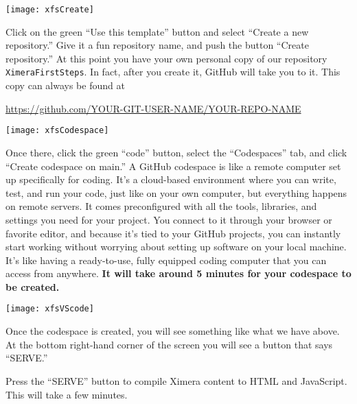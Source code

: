 \documentclass{ximera}
\begin{document}
\begin{image}
    \texttt{[image: xfsCreate]}
\end{image}
Click on the green ``Use this template'' button and select ``Create a
new repository.'' Give it a fun repository name, and push the button
``Create repository.'' 
At this point you have your own personal copy of our repository \verb!XimeraFirstSteps!. 
In fact, after you create it, GitHub will take you to it. This copy can always be found at
\begin{center}
    \url{https://github.com/YOUR-GIT-USER-NAME/YOUR-REPO-NAME}
\end{center}
\newpage
\pdfOnly{\end{multicols}}
\begin{image}
    \texttt{[image: xfsCodespace]}
\end{image}
    Once there, click the green ``code'' button, select
        the ``Codespaces'' tab, and click ``Create codespace on main.''
        A GitHub codespace is like a remote computer set up specifically for coding.
        It's a cloud-based environment where you can write, test, and run your code,
        just like on your own computer, but everything happens on remote servers. It
        comes preconfigured with all the tools, libraries, and settings you need for
        your project. You connect to it through your browser or favorite editor, and
        because it's tied to your GitHub projects, you can instantly start working
        without worrying about setting up software on your local machine. It's like
        having a ready-to-use, fully equipped coding computer that you can access from
        anywhere. \textbf{It will take around 5 minutes for your codespace to be
            created.}
\pdfOnly{\end{multicols}}

\newpage

\begin{image}
    \texttt{[image: xfsVScode]}
\end{image}
Once the codespace is created, you will see something like what we have above.
At the bottom right-hand corner of the screen you will see a button that says
``SERVE.''


Press the ``SERVE'' button to compile Ximera content to HTML and JavaScript.  This will take a few minutes.
\pdfOnly{\end{multicols}}
\end{document}
